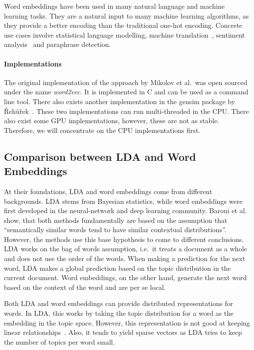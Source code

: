 \documentclass{sig-alternate-05-2015}
\begin{document}
Word embeddings have been used in many natural language and machine learning tasks.
They are a natural input to many machine learning algorithms, as they provide a better encoding than the traditional one-hot encoding.
Concrete use cases involve statistical language modelling, machine translation~\cite{Zou2013}, sentiment analysis~\cite{Maas2011} and paraphrase detection.

\paragraph{Implementations}
The original implementation of the approach by Mikolov et al.~was open sourced under the name \emph{word2vec}.
It is implemented in C and can be used as a command line tool.
There also exists another implementation in the gensim package by {\v R}eh{\r u}{\v r}ek~\cite{Rehurek2010}.
These two implementations can run multi-threaded in the CPU.
There also exist some GPU implementations, however, these are not as stable.
Therefore, we will concentrate on the CPU implementations first.

\subsection{Comparison between LDA and Word Embeddings}

At their foundations, LDA and word embeddings come from different backgrounds.
LDA stems from Bayesian statistics, while word embeddings were first developed in the neural-network and deep learning community.
Baroni et al.~\cite{Baroni2014} show, that both methods fundamentally are based on the assumption that ``semantically similar words tend to have similar contextual distributions''.
However, the methods use this base hypothesis to come to different conclusions.
LDA works on the bag of words assumption, i.e.\ it treats a document as a whole and does not use the order of the words.
When making a prediction for the next word, LDA makes a global prediction based on the topic distribution in the current document.
Word embeddings, on the other hand, generate the next word based on the context of the word and are per se local.

Both LDA and word embeddings can provide distributed representations for words.
In LDA, this works by taking the topic distribution for a word as the embedding in the topic space.
However, this representation is not good at keeping linear relationships~\cite{Mikolov2013b,Mikolov2013a}.
Also, it tends to yield sparse vectors as LDA tries to keep the number of topics per word small.
\end{document}
